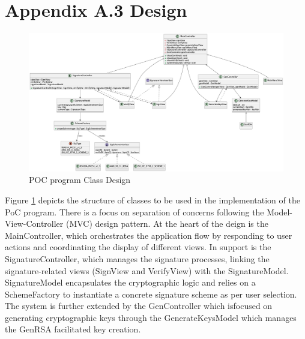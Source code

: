 \documentclass[]{final_report}
\theoremstyle{definition}
\begin{document}
\section{Appendix A.3 Design}
\begin{landscape}
\thispagestyle{lscape} %
\begin{figure}[H]
    \centering
    \includegraphics[width=\linewidth,keepaspectratio]{POC.png}
    \caption{POC program Class Design}
    \label{fig:POCCLASSES}
\end{figure}
\end{landscape}
Figure \ref{fig:POCCLASSES} depicts the structure of classes to be used in the implementation of the PoC program.  There is a focus on separation of concerns following the Model-View-Controller (MVC) design pattern. At the heart of the deign is the MainController, which orchestrates the application flow by responding to user actions and coordinating the display of different views. In support is the SignatureController, which manages the signature processes, linking the signature-related views (SignView and VerifyView) with the SignatureModel. SignatureModel encapsulates the cryptographic logic and relies on a SchemeFactory to instantiate a concrete signature scheme as per user selection. The system is further extended by the GenController which isfocused on generating cryptographic keys through the GenerateKeysModel which manages the GenRSA facilitated key creation.
\end{document}
